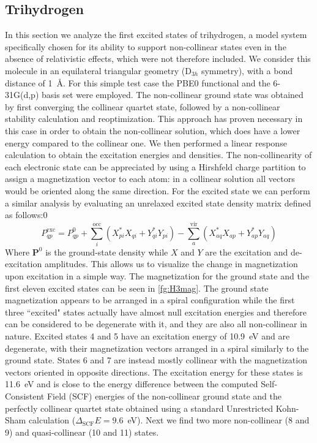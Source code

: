 \documentclass[12pt]{article}
\begin{document}
\subsection{Trihydrogen}
In this section we analyze the first excited states of trihydrogen, a model system specifically chosen for its ability to support non-collinear states even in the absence of relativistic effects,\cite{Li15_154109} which were not therefore included.
We consider this molecule in an equilateral triangular geometry (D$_{3h}$ symmetry), with a bond distance of 1~\r{A}.
For this simple test case the PBE0 functional and the 6-31G(d,p) basis set were employed.
The non-collinear ground state was obtained by first converging the collinear quartet state, followed by a non-collinear stability calculation and reoptimization.
This approach has proven necessary in this case in order to obtain the non-collinear solution, which does have a lower energy compared to the collinear one.
We then performed a linear response calculation to obtain the excitation energies and densities.
The non-collinearity of each electronic state can be appreciated by using a Hirshfeld charge partition\cite{Hirshfeld77_129} to assign a magnetization vector to each atom: in a collinear solution all vectors would be oriented along the same direction.
For the excited state we can perform a similar analysis by evaluating an unrelaxed excited state density matrix defined as follows:\cite{Yeager82_69,Casida09_60,Casida09_3}0
\begin{equation}
 P_{qp}^\mathrm{exc} %
                     = P_{qp}^0 + \sum_i^\mathrm{occ} (X_{pi}^*X_{qi}+Y_{qi}^*Y_{pi})-\sum_a^\mathrm{vir} (X_{aq}^*X_{ap}+Y_{ap}^*Y_{aq})
\end{equation}
Where $\mathbf{P}^0$ is the ground-state density while $X$ and $Y$ are the excitation and de-excitation amplitudes.
This allows us to visualize the change in magnetization upon excitation in a simple way.
The magnetization for the ground state and the first eleven excited states can be seen in \cref{fg:H3mag}.
The ground state magnetization appears to be arranged in a spiral configuration while the first three ``excited" states actually have almost null excitation energies and therefore can be considered to be degenerate with it, and they are also all non-collinear in nature.
Excited states 4 and 5 have an excitation energy of 10.9~eV and are degenerate, with their magnetization vectors arranged in a spiral similarly to the ground state.
States 6 and 7 are instead mostly collinear with the magnetization vectors oriented in opposite directions.
The excitation energy for these states is 11.6~eV and is close to the energy difference between the computed Self-Consistent Field (SCF) energies of the non-collinear ground state and the perfectly collinear quartet state obtained using a standard Unrestricted Kohn-Sham calculation ($\Delta_\mathrm{SCF}E = 9.6$~eV).
Next we find two more non-collinear (8 and 9) and quasi-collinear (10 and 11) states.
\end{document}

